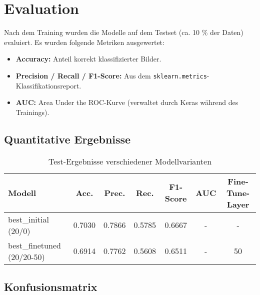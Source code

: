 \chapter{Evaluation}
\label{chap:evaluation}

Nach dem Training wurden die Modelle auf dem Testset (ca. 10 \% der Daten) evaluiert. Es wurden folgende Metriken ausgewertet:
\begin{itemize}
  \item \textbf{Accuracy:} Anteil korrekt klassifizierter Bilder.  
  \item \textbf{Precision / Recall / F1-Score:} Aus dem \texttt{sklearn.metrics}-Klassifikationsreport.  
  \item \textbf{AUC:} Area Under the ROC-Kurve (verwaltet durch Keras während des Trainings).
    
\end{itemize}

\section{Quantitative Ergebnisse}
\begin{table}[h]
\centering
\caption{Test-Ergebnisse verschiedener Modellvarianten}
\label{tab:results}
\begin{tabular}{lcccccc}
\toprule
Modell                    & Acc. & Prec. & Rec. & F1-Score & AUC  & Fine-Tune-Layer\\
\midrule
best\_initial (20/0)      & 0.7030 & 0.7866 & 0.5785 & 0.6667 & -     & - \\
best\_finetuned (20/20-50)& 0.6914 & 0.7762 & 0.5608 & 0.6511 & -     & 50 \\
\bottomrule
\end{tabular}
\end{table}

\section{Konfusionsmatrix}

